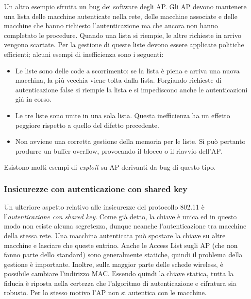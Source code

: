 Un altro esempio sfrutta un bug dei software degli AP. Gli AP devono mantenere una lista delle macchine autenticate nella rete, delle macchine associate e delle macchine che hanno richiesto l'autenticazione ma che ancora non hanno completato le procedure. Quando una lista si riempie, le altre richieste in arrivo vengono scartate. Per la gestione di queste liste devono essere applicate politiche efficienti; alcuni esempi di inefficienza sono i seguenti:
\begin{itemize}
	\item Le liste sono delle code a scorrimento: se la lista è piena e arriva una nuova macchina, la più vecchia viene tolta dalla lista. Forgiando richieste di autenticazione false si riempie la lista e si impediscono anche le autenticazioni già in corso.
	\item Le tre liste sono unite in una sola lista. Questa inefficienza ha un effetto peggiore rispetto a quello del difetto precedente.
	\item Non avviene una corretta gestione della memoria per le liste. Si può pertanto produrre un buffer overflow, provocando il blocco o il riavvio dell'AP.
\end{itemize}
Esistono molti esempi di \textit{exploit} su AP derivanti da bug di questo tipo.

\subsubsection{Insicurezze con autenticazione con shared key}
Un ulteriore aspetto relativo alle insicurezze del protocollo 802.11 è l'\textit{autenticazione con shared key}. Come già detto, la chiave è unica ed in questo modo non esiste alcuna segretezza, dunque neanche l'autenticazione tra macchine della stessa rete. Una macchina autenticata può spostare la chiave su altre macchine e lasciare che queste entrino. Anche le Access List sugli AP (che non fanno parte dello standard) sono generalmente statiche, quindi il problema della gestione è importante. Inoltre, sulla maggior parte delle schede wireless, è possibile cambiare l'indirizzo MAC. Essendo quindi la chiave statica, tutta la fiducia è riposta nella certezza che l'algoritmo di autenticazione e cifratura sia robusto. Per lo stesso motivo l'AP non si autentica con le macchine.\\

